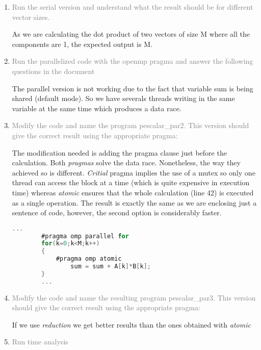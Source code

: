 \documentclass{article}
\begin{document}
\begin{enumerate}

    \item \textcolor{gray}{Run the serial version and understand what the result should be for different vector sizes.} 
    
    As we are calculating the dot product of two vectors of size M where all the components are 1, the expected output is M.
    
    \item \textcolor{gray}{Run the parallelized code with the openmp pragma and answer the following questions in the document}
    
    The parallel version is not working due to the fact that variable sum is being shared (default mode). So we have severals threads writing in the same variable at the same time which produces a data race.

    \item \textcolor{gray}{Modify the code and name the program pescalar\_par2. This version should give the correct result 
    using the appropriate pragma:}

    The modification needed is adding the pragma clause just before the calculation.
    Both \emph{pragmas} solve the data race. Nonetheless, the way they achieved so is different. \emph{Critial} pragma implies the use of a mutex so only one thread can access the block at a time (which is quite expensive in execution time) whereas \emph{atomic} ensures that the whole calculation (line 42) is executed as a single operation. The result is exactly the same as we are enclosing just a sentence of code, however, the second option is considerably faster.

    \begin{lstlisting}[language=C, texcl=true]
        ...
        #pragma omp parallel for 
        for(k=0;k<M;k++)
        {	
            #pragma omp atomic
                sum = sum + A[k]*B[k];
        } 
        ...
    \end{lstlisting}

    \item \textcolor{gray}{Modify the code and name the resulting program pescalar\_par3. This version should give the correct 
    result using the appropriate pragma: }

    If we use \emph{reduction} we get better results than the ones obtained with \emph{atomic}

    \item \textcolor{gray}{Run time analysis}

\end{enumerate}
\end{document}
